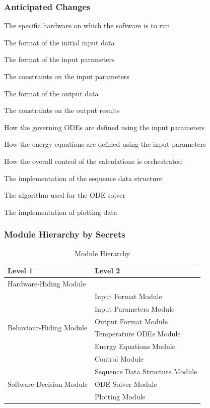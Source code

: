 \documentclass[t,12pt,numbers,fleqn]{beamer}
\begin{document}
\begin{frame}
\frametitle{Anticipated Changes}

\bi
\item The specific hardware on which the software is to run
\item The format of the initial input data
\item The format of the input parameters
\item The constraints on the input parameters
\item The format of the output data
\item The constraints on the output results
\item How the governing ODEs are defined using the input parameters
\item How the energy equations are defined using the input parameters
\item How the overall control of the calculations is orchestrated
\item The implementation of the sequence data structure
\item The algorithm used for the ODE solver
\item The implementation of plotting data
\ei

\end{frame}


\begin{frame}
\frametitle{Module Hierarchy by Secrets}
\begin{table}[h!]
\centering
\begin{tabular}{p{} p{}}
\toprule
\textbf{Level 1} & \textbf{Level 2}\\
\midrule

{Hardware-Hiding Module} & ~ \\
\midrule

\multirow{6}{0.3\textwidth}{Behaviour-Hiding Module} & Input Format Module\\
& Input Parameters Module\\
& Output Format Module\\
& Temperature ODEs Module\\
& Energy Equations Module\\ 
& Control Module\\
\midrule

\multirow{3}{0.3\textwidth}{Software Decision Module} & {Sequence Data Structure Module}\\
& ODE Solver Module\\
& Plotting Module\\
\bottomrule

\end{tabular}
\caption{Module Hierarchy}
\label{TblMH}
\end{table}
\end{frame}
\end{document}
